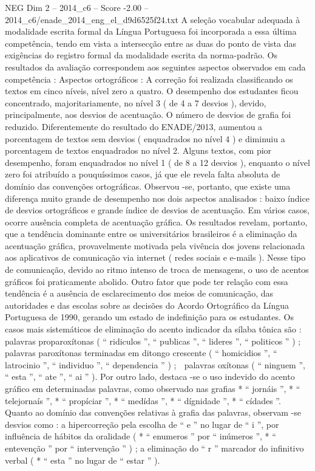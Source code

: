 \begin{textsample}{NEG Dim 2 – 2014\_c6 – Score -2.00 – 2014\_c6/enade\_2014\_eng\_el\_d9d6525f24.txt}
A seleção vocabular adequada à modalidade escrita formal da Língua Portuguesa foi incorporada a essa última competência, tendo em vista a intersecção entre as duas do ponto de vista das exigências do registro formal da modalidade escrita da norma-padrão.
Os resultados da avaliação correspondem aos seguintes aspectos observados em cada competência : Aspectos ortográficos : A correção foi realizada classificando os textos em cinco níveis, nível zero a quatro.
O desempenho dos estudantes ficou concentrado, majoritariamente, no nível 3 ( de 4 a 7 desvios ), devido, principalmente, aos desvios de acentuação.
O número de desvios de grafia foi reduzido.
Diferentemente do resultado do ENADE/2013, aumentou a porcentagem de textos sem desvios ( enquadrados no nível 4 ) e diminuiu a porcentagem de textos enquadrados no nível 2.
Alguns textos, com pior desempenho, foram enquadrados no nível 1 ( de 8 a 12 desvios ), enquanto o nível zero foi atribuído a pouquíssimos casos, já que ele revela falta absoluta de domínio das convenções ortográficas.
Observou -se, portanto, que existe uma diferença muito grande de desempenho nos dois aspectos analisados : baixo índice de desvios ortográficos e grande índice de desvios de acentuação.
Em vários casos, ocorre ausência completa de acentuação gráfica.
Os resultados revelam, portanto, que a tendência dominante entre os universitários brasileiros é a eliminação da acentuação gráfica, provavelmente motivada pela vivência dos jovens relacionada aos aplicativos de comunicação via internet ( redes sociais e e-mails ).
Nesse tipo de comunicação, devido ao ritmo intenso de troca de mensagens, o uso de acentos gráficos foi praticamente abolido.
Outro fator que pode ter relação com essa tendência é a ausência de esclarecimento dos meios de comunicação, das autoridades e das escolas sobre as decisões do Acordo Ortográfico da Língua Portuguesa de 1990, gerando um estado de indefinição para os estudantes.
Os casos mais sistemáticos de eliminação do acento indicador da sílaba tônica são :  palavras proparoxítonas ( “ ridiculos ”, “ publicas ”, “ lideres ”, “ politicos ” ) ;  palavras paroxítonas terminadas em ditongo crescente ( “ homicidios ”, “ latrocinio ”, “ individuo ”, “ dependencia ” ) ;  palavras oxítonas ( “ ninguem ”, “ esta ”, “ ate ”, “ ai ” ).
Por outro lado, destaca -se o uso indevido do acento gráfico em determinadas palavras, como observado nas grafias * “ jornáis ”, * “ telejornaís ”, * “ propíciar ”, * “ medídas ”, * “ dígnidade ”, * “ cídades ”.
Quanto ao domínio das convenções relativas à grafia das palavras, observam -se desvios como : a hipercorreção pela escolha de “ e ” no lugar de “ i ”, por influência de hábitos da oralidade ( * “ enumeros ” por “ inúmeros ”, * “ entevenção ” por “ intervenção ” ) ; a eliminação do “ r ” marcador do infinitivo verbal ( * “ esta ” no lugar de “ estar ” ).

\end{textsample}
